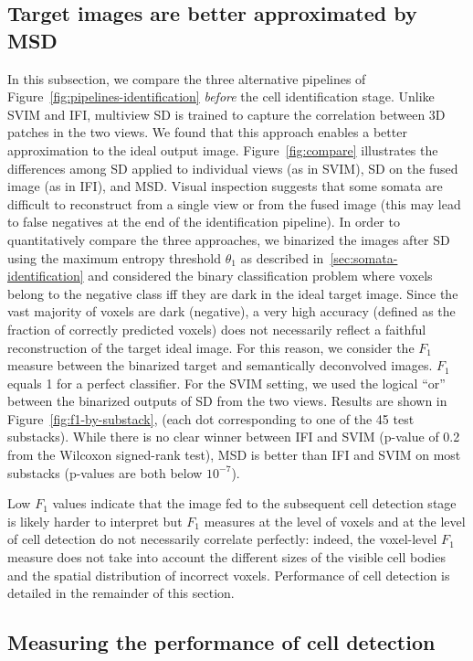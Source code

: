 \documentclass[smallextended]{svjour3}       %
\begin{document}
\subsection{Target images are better approximated by MSD}
\label{sec:MSD-is-better}
In this subsection, we compare the three alternative pipelines of
Figure~\ref{fig:pipelines-identification} \textit{before} the cell
identification stage. Unlike SVIM and IFI, multiview SD is trained to
capture the correlation between 3D patches in the two views. We found
that this approach enables a better approximation to the ideal output
image.  Figure~\ref{fig:compare} illustrates the differences among SD
applied to individual views (as in SVIM), SD on the fused image (as in
IFI), and MSD. Visual inspection suggests that some somata are
difficult to reconstruct from a single view or from the fused image
(this may lead to false negatives at the end of the identification
pipeline). In order to quantitatively compare the three approaches, we
binarized the images after SD using the maximum entropy threshold
$\theta_1$ as described in~\ref{sec:somata-identification} and
considered the binary classification problem where voxels belong to
the negative class iff they are dark in the ideal target
image. Since the vast majority of voxels are dark (negative), a very
high accuracy (defined as the fraction of correctly predicted voxels)
does not necessarily reflect a faithful reconstruction of the target
ideal image. For this reason, we consider the
$F_1$ measure between the binarized target and semantically
deconvolved images. $F_1$ equals 1 for a perfect classifier.  For the
SVIM setting, we used the logical ``or'' between the binarized
outputs of SD from the two views. Results are shown in
Figure~\ref{fig:f1-by-substack}, (each dot corresponding to one of the
45 test substacks).  While there is no clear winner between IFI and
SVIM (p-value of 0.2 from the Wilcoxon signed-rank test),
MSD is better than IFI and SVIM on most substacks (p-values are both
below $10^{-7}$).

Low $F_1$ values indicate that the image fed to the subsequent cell
detection stage is likely harder to interpret but $F_1$ measures at the
level of voxels and at the level of cell detection do not necessarily
correlate perfectly: indeed, the voxel-level $F_1$ measure does not take
into account the different sizes of the visible cell bodies and the
spatial distribution of incorrect voxels. Performance of cell
detection is detailed in the remainder of this section.


\subsection{Measuring the performance of cell detection}
\label{sec:performance-evaluation}
\end{document}
